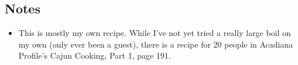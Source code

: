 \begin{multicols}{2}
\begin{enumerate}
\end{enumerate}

\subsection*{Notes}
\begin{itemize}
    \item This is mostly my own recipe. While I've not yet tried a really large boil on my own (only ever been a guest), there is a recipe for 20 people in Acadiana Profile's Cajun Cooking, Part 1, page 191.
\end{itemize}
\end{multicols}
\clearpage